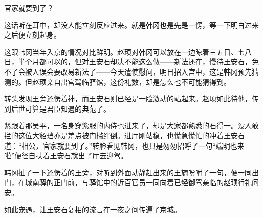 官家就要到了？

这话听在耳中，却没人能立刻反应过来。就是韩冈也是先是一愣，等一下明白过来之后便立刻起身。

这跟韩冈当年入京的情况对比鲜明。赵顼对韩冈可以放在一边晾着三五日、七八日，半个月都可以的，但对王安石却决不能这么做——新法还在，慢待王安石，免不了会被人误会要改易新法了——今天遣使慰问，明日招入宫中，这是韩冈预先猜测的。但赵顼亲自出宫驾临驿馆，这份礼数，却是怎么也不可能猜得到。

转头发现王旁还愣着神，而王安石则已经是一脸激动的站起来。赵顼如此待他，传到后世可算是君臣知遇的典范了。

紧跟着那吴平，一名身穿紫服的内侍也进来了，却是大家都熟悉的石得一。没人敢拦的这位大貂珰亦是差点被门槛绊倒。进厅刚站稳，也慌急慌忙的冲着王安石道：“相公，官家就要到了。”转脸看见韩冈，也只是匆匆招呼了一句“端明也来啦”便径自扶着王安石就出了厅去迎驾。

韩冈扯了一下还愣着的王旁，对听到外面动静赶出来的王旖吩咐了一句，便一同出门，在城南驿的正门前，与驿馆中的近百官员一同向着已经御驾亲临的赵顼行礼问安。

如此宠遇，让王安石复相的流言在一夜之间传遍了京城。

